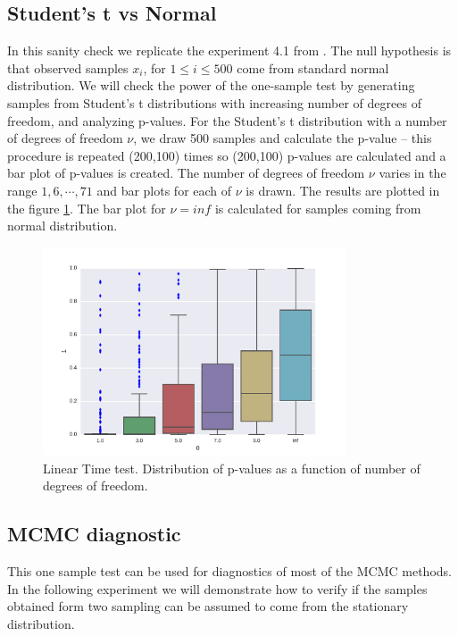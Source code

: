 \documentclass{article}
\begin{document}
\subsection{Student's t vs Normal}
In this  sanity check we replicate the experiment 4.1 from \cite{gorham2015measuring}. The null hypothesis is that observed samples $x_i$, for $1 \leq i \leq 500$ come from standard normal distribution. We will check the power of the one-sample test by generating samples from Student's t distributions with increasing number of degrees of freedom, and analyzing p-values. For the Student's t distribution with a number of degrees of freedom $\nu$, we draw 500 samples and calculate the p-value -- this procedure is repeated (200,100) times so (200,100) p-values are calculated and a bar plot of p-values is created. The number of degrees of freedom $\nu$ varies in the range $1,6,\cdots,71$ and bar plots for each of $\nu$ is drawn.  The results are plotted in the figure \ref{fig:studentst}. The bar plot for $\nu = inf$ is calculated for samples coming from normal distribution.

\begin{figure}
\label{fig:studentst}
\includegraphics[width=0.8\textwidth]{./img/student.pdf}
\caption{Linear Time test. Distribution of p-values as a function of number of degrees of freedom.}
\end{figure}



\subsection{MCMC diagnostic}
This one sample test can be used for diagnostics of most of the MCMC methods. In the following experiment we will demonstrate how to verify if the samples obtained form two sampling can be assumed to come from the stationary distribution.  
\end{document}
